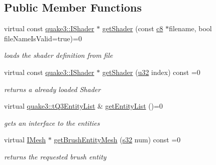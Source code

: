 \subsection*{Public Member Functions}
\begin{DoxyCompactItemize}
\item 
virtual const \hyperlink{structirr_1_1scene_1_1quake3_1_1IShader}{quake3\+::\+I\+Shader} $\ast$ \hyperlink{classirr_1_1scene_1_1IQ3LevelMesh_aa2f9609e950e32876665d7531a54a484}{get\+Shader} (const \hyperlink{namespaceirr_a9395eaea339bcb546b319e9c96bf7410}{c8} $\ast$filename, bool file\+Name\+Is\+Valid=true)=0
\begin{DoxyCompactList}\small\item\em loads the shader definition from file \end{DoxyCompactList}\item 
\mbox{\label{classirr_1_1scene_1_1IQ3LevelMesh_a71c4481a2c9b0a99210ed7d4b8a8fc20}} 
virtual const \hyperlink{structirr_1_1scene_1_1quake3_1_1IShader}{quake3\+::\+I\+Shader} $\ast$ \hyperlink{classirr_1_1scene_1_1IQ3LevelMesh_a71c4481a2c9b0a99210ed7d4b8a8fc20}{get\+Shader} (\hyperlink{namespaceirr_a0416a53257075833e7002efd0a18e804}{u32} index) const =0
\begin{DoxyCompactList}\small\item\em returns a already loaded Shader \end{DoxyCompactList}\item 
\mbox{\label{classirr_1_1scene_1_1IQ3LevelMesh_a6e95f072e7bfe1d96a587ed3c27eedfc}} 
virtual \hyperlink{classirr_1_1core_1_1array}{quake3\+::t\+Q3\+Entity\+List} \& \hyperlink{classirr_1_1scene_1_1IQ3LevelMesh_a6e95f072e7bfe1d96a587ed3c27eedfc}{get\+Entity\+List} ()=0
\begin{DoxyCompactList}\small\item\em get\textquotesingle{}s an interface to the entities \end{DoxyCompactList}\item 
virtual \hyperlink{classirr_1_1scene_1_1IMesh}{I\+Mesh} $\ast$ \hyperlink{classirr_1_1scene_1_1IQ3LevelMesh_ad0ed15c97e55ffb02d1d48fb62a769d5}{get\+Brush\+Entity\+Mesh} (\hyperlink{namespaceirr_ac66849b7a6ed16e30ebede579f9b47c6}{s32} num) const =0
\begin{DoxyCompactList}\small\item\em returns the requested brush entity \end{DoxyCompactList}\item 

\end{DoxyCompactItemize}
